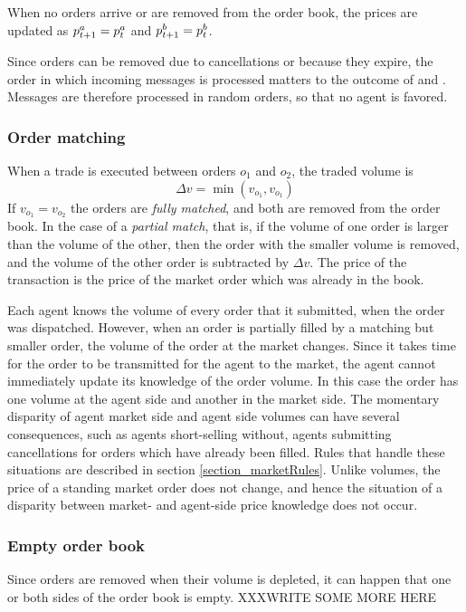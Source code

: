 When no orders arrive or are removed from the order book, the prices are updated as $\pask[ + 1] = \pask$ and $\pbid[ + 1] = \pbid$.

Since orders can be removed due to cancellations or because they expire, the order in which incoming messages is processed matters to the outcome of \pask{} and \pbid. Messages are therefore processed in random orders, so that no agent is favored.



\subsubsection{Order matching}
When a trade is executed between orders $o_1$ and $o_2$, the traded volume is 
\begin{equation}
\Delta v = \min (v_{o_1}, v_{o_1}) \nonumber
\end{equation}
If $v_{o_1} = v_{o_2}$ the orders are \textit{fully matched}, and both are removed from the order book. In the case of a \textit{partial match}, that is, if the volume of one order is larger than the volume of the other, then the order with the smaller volume is removed, and the volume of the other order is subtracted by $\Delta v$. The price of the transaction is the price of the market order which was already in the book. 

Each agent knows the volume of every order that it submitted, when the order was dispatched. However, when an order is partially filled by a matching but smaller order, the volume of the order at the market changes. Since it takes time for the order to be transmitted for the agent to the market, the agent cannot immediately update its knowledge of the order volume. In this case the order has one volume at the agent side and another in the market side. The momentary disparity of agent market side and agent side volumes can have several consequences, such as agents short-selling without, agents submitting cancellations for orders which have already been filled. Rules that handle these situations are described in section \ref{section_marketRules}. Unlike volumes, the price of a standing market order does not change, and hence the situation of a disparity between market- and agent-side price knowledge does not occur.

\subsubsection{Empty order book}
Since orders are removed when their volume is depleted, it can happen that one or both sides of the order book is empty. XXXWRITE SOME MORE HERE



